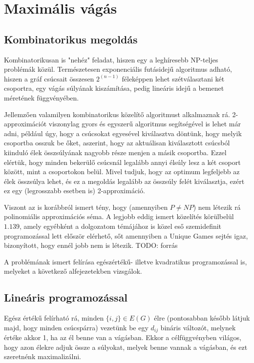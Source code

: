 \section{Maximális vágás}

\subsection{Kombinatorikus megoldás}

Kombinatorikusan is "nehéz" feladat, hiszen egy a leghíresebb NP-teljes problémák közül. Természetesen exponenciális futásidejű algoritmus adható, hiszen a gráf csúcsait összesen $2^(n-1)$ féleképpen lehet szétválasztani két csoportra, egy vágás súlyának kiszámítása, pedig lineáris idejű a bemenet méretének függvényében.

Jellemzően valamilyen kombinatorikus közelítő algoritmust alkalmaznak rá. 2-approximációt viszonylag gyors és egyszerű algoritmus segítségével is lehet már adni, például úgy, hogy a csúcsokat egyesével kiválasztva döntünk, hogy melyik csoportba osszuk be őket, aszerint, hogy az aktuálisan kiválasztott csúcsból kiinduló élek összsúlyának nagyobb része menjen a másik csoportba. Ezzel elértük, hogy minden bekerülő csúcsnál legalább annyi élsúly lesz a két csoport között, mint a csoportokon belül. Mivel tudjuk, hogy az optimum legfeljebb az élek összsúlya lehet, és ez a megoldás legalább az összsúly felét kiválasztja, ezért ez egy (legrosszabb esetben is) 2-approximáció.

Viszont az is korábbról ismert tény, hogy (amennyiben $P \neq NP$) nem létezik rá polinomiális approximációs séma. A legjobb eddig ismert közelítés körülbelül $1.139$, amely egyébként a dolgozatom témájához is közel eső szemidefinit programozással lett először elérhető, sőt amennyiben a Unique Games sejtés igaz, bizonyított, hogy ennél jobb nem is létezik. TODO: forrás

A problémának ismert felírása egészértékű- illetve kvadratikus programozással is, melyeket a következő alfejezetekben vizsgálok.

\subsection{Lineáris programozással}

Egész értékű felírható rá, minden $\{i,j\} \in E(G)$ élre (pontosabban később látjuk majd, hogy minden csúcspárra) vezetünk be egy $d_{ij}$ bináris változót, melynek értéke akkor 1, ha az él benne van a vágásban. Ekkor a célfüggvényben világos, hogy azon élekre adjuk össze a súlyokat, melyek benne vannak a vágásban, és ezt szeretnénk maximalizálni.

